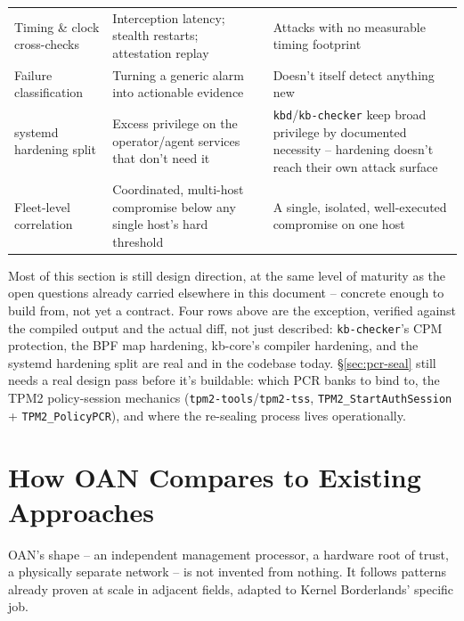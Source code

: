 \documentclass[11pt,a4paper]{article}
\begin{document}
\begin{center}
\begin{tabular}{@{}p{3.3cm}p{5.6cm}p{4.1cm}@{}}
Timing \& clock cross-checks & Interception latency; stealth restarts;
attestation replay & Attacks with no measurable timing footprint \\
Failure classification & Turning a generic alarm into actionable
evidence & Doesn't itself detect anything new \\
systemd hardening split & Excess privilege on the operator/agent
services that don't need it & \texttt{kbd}/\texttt{kb-checker} keep
broad privilege by documented necessity -- hardening doesn't reach
their own attack surface \\
Fleet-level correlation & Coordinated, multi-host compromise below any
single host's hard threshold & A single, isolated, well-executed
compromise on one host \\
\bottomrule
\end{tabular}
\end{center}

\begin{notebox}[Status]
Most of this section is still design direction, at the same level of
maturity as the open questions already carried elsewhere in this
document -- concrete enough to build from, not yet a contract. Four
rows above are the exception, verified against the compiled output and
the actual diff, not just described: \texttt{kb-checker}'s CPM
protection, the BPF map hardening, kb-core's compiler hardening, and
the systemd hardening split are real and in the codebase today.
\S\ref{sec:pcr-seal} still needs a real design pass before it's
buildable: which PCR banks to bind to, the TPM2 policy-session
mechanics (\texttt{tpm2-tools}/\texttt{tpm2-tss},
\texttt{TPM2\_StartAuthSession} + \texttt{TPM2\_PolicyPCR}), and where
the re-sealing process lives operationally.
\end{notebox}

\section{How OAN Compares to Existing Approaches}
\label{sec:comparison}

OAN's shape -- an independent management processor, a hardware root of
trust, a physically separate network -- is not invented from nothing.
It follows patterns already proven at scale in adjacent fields, adapted
to Kernel Borderlands' specific job.
\end{document}
